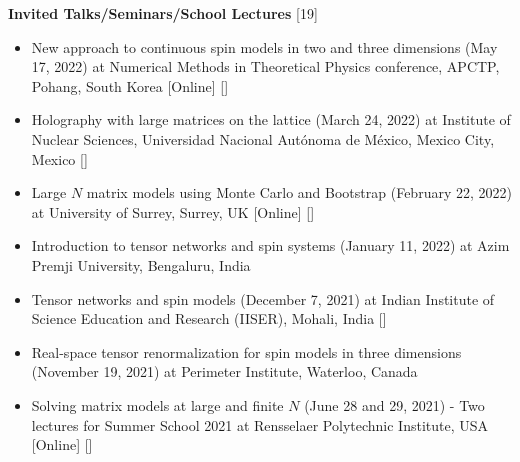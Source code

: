\vspace{2mm} 
\textcolor{alizarin}{\textbf{\fontsize{10}{38} \bfseries Invited Talks/Seminars/School Lectures} [19]}

\begin{itemize}

 \item New approach to continuous spin models in two and three dimensions
 (May 17, 2022) at Numerical Methods in Theoretical Physics conference, APCTP, Pohang, South Korea [Online]  
 []
 \vspace{1mm} 
 
 \item Holography with large matrices on the lattice (March 24, 2022) at Institute of Nuclear Sciences, 
 Universidad Nacional Aut\'{o}noma de M\'{e}xico, Mexico City, Mexico   
  []
 \vspace{1mm}%
 
\item Large $N$ matrix models using Monte Carlo and Bootstrap
 (February 22, 2022) at University of Surrey, Surrey, UK [Online]  
 []
 \vspace{1mm} 
 
 \item Introduction to tensor networks and spin systems 
 (January 11, 2022) at Azim Premji University, Bengaluru, India  \vspace{1mm} 
 
 \item Tensor networks and spin models 
 (December 7, 2021) at Indian Institute of Science Education and Research (IISER), Mohali, India 
 []  \vspace{1mm} 
 
  \item Real-space tensor renormalization for spin models in three dimensions 
 (November 19, 2021) at Perimeter Institute, Waterloo, Canada \vspace{1mm}  
 
 \item Solving matrix models at large and finite $N$ (June 28 and 29, 2021) - Two lectures for 
Summer School 2021 at Rensselaer Polytechnic Institute, USA [Online]  
  [] \vspace{1mm} 
 

\end{itemize}

